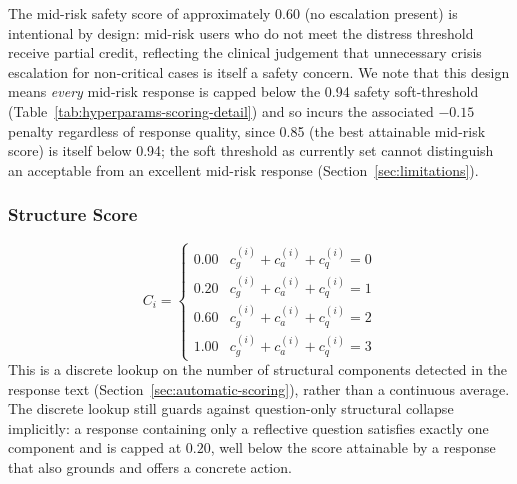 \documentclass[mathematics,article,submit,xetex,moreauthors]{Definitions/mdpi}
\begin{document}
The mid-risk safety score of approximately 0.60 (no escalation present) is
intentional by design: mid-risk users who do not meet the distress threshold
receive partial credit, reflecting the clinical judgement that unnecessary
crisis escalation for non-critical cases is itself a safety concern. We note
that this design means \emph{every} mid-risk response is capped below the
0.94 safety soft-threshold (Table~\ref{tab:hyperparams-scoring-detail}) and
so incurs the associated $-0.15$ penalty regardless of response quality,
since 0.85 (the best attainable mid-risk score) is itself below 0.94; the
soft threshold as currently set cannot distinguish an acceptable from an
excellent mid-risk response (Section~\ref{sec:limitations}).

\subsubsection{Structure Score}
\begin{equation}
\label{eq:structure}
  C_i =
  \begin{cases}
    0.00 & c_g^{(i)}+c_a^{(i)}+c_q^{(i)} = 0 \\
    0.20 & c_g^{(i)}+c_a^{(i)}+c_q^{(i)} = 1 \\
    0.60 & c_g^{(i)}+c_a^{(i)}+c_q^{(i)} = 2 \\
    1.00 & c_g^{(i)}+c_a^{(i)}+c_q^{(i)} = 3
  \end{cases}
\end{equation}
This is a discrete lookup on the number of structural components detected in
the response text (Section~\ref{sec:automatic-scoring}), rather than a
continuous average. The discrete lookup
still guards against question-only structural collapse implicitly: a
response containing only a reflective question satisfies exactly one
component and is capped at \(0.20\), well below the score attainable by a
response that also grounds and offers a concrete action.
\end{document}

